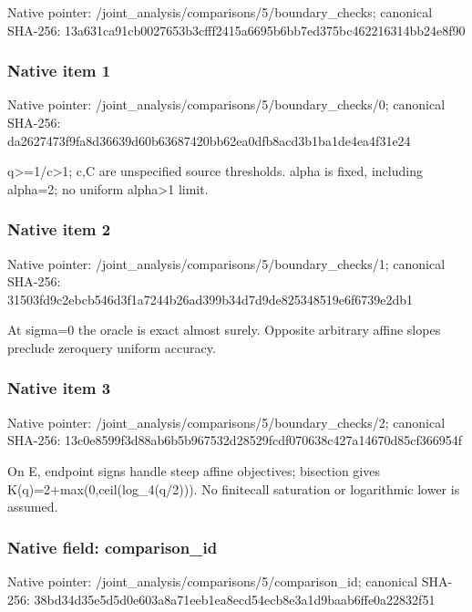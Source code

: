 \documentclass[10pt,a4paper]{article}
\begin{document}
Native pointer: /joint\_analysis/comparis\allowbreak{}ons/5/boundary\_checks; canonical SHA-256: 13a631ca91cb0027653b3cff\allowbreak{}f2415a6695b6bb7ed375bc46\allowbreak{}2216314bb24e8f90



\subsubsection{Native item 1}


Native pointer: /joint\_analysis/comparis\allowbreak{}ons/5/boundary\_checks/0; canonical SHA-256: da2627473f9fa8d36639d60b\allowbreak{}63687420bb62ea0dfb8acd3b\allowbreak{}1ba1de4ea4f31e24


q>=1/c>1; c,C are unspecified source thresholds. alpha is fixed, including alpha=2; no uniform alpha>1 limit.


\subsubsection{Native item 2}


Native pointer: /joint\_analysis/comparis\allowbreak{}ons/5/boundary\_checks/1; canonical SHA-256: 31503fd9c2ebcb546d3f1a72\allowbreak{}44b26ad399b34d7d9de82534\allowbreak{}8519e6f6739e2db1


At sigma=0 the oracle is exact almost surely. Opposite arbitrary affine slopes preclude zeroquery uniform accuracy.


\subsubsection{Native item 3}


Native pointer: /joint\_analysis/comparis\allowbreak{}ons/5/boundary\_checks/2; canonical SHA-256: 13c0e8599f3d88ab6b5b9675\allowbreak{}32d28529fcdf070638c427a1\allowbreak{}4670d85cf366954f


On E, endpoint signs handle steep affine objectives; bisection gives K(q)=2+max(0,ceil(log\_4(q/2))). No finitecall saturation or logarithmic lower is assumed.


\subsubsection{Native field: comparison\_id}


Native pointer: /joint\_analysis/comparis\allowbreak{}ons/5/comparison\_id; canonical SHA-256: 38bd34d35e5d5d0e603a8a71\allowbreak{}eeb1ea8ecd54ecb8e3a1d9ba\allowbreak{}ab6ffe0a22832f51
\end{document}
